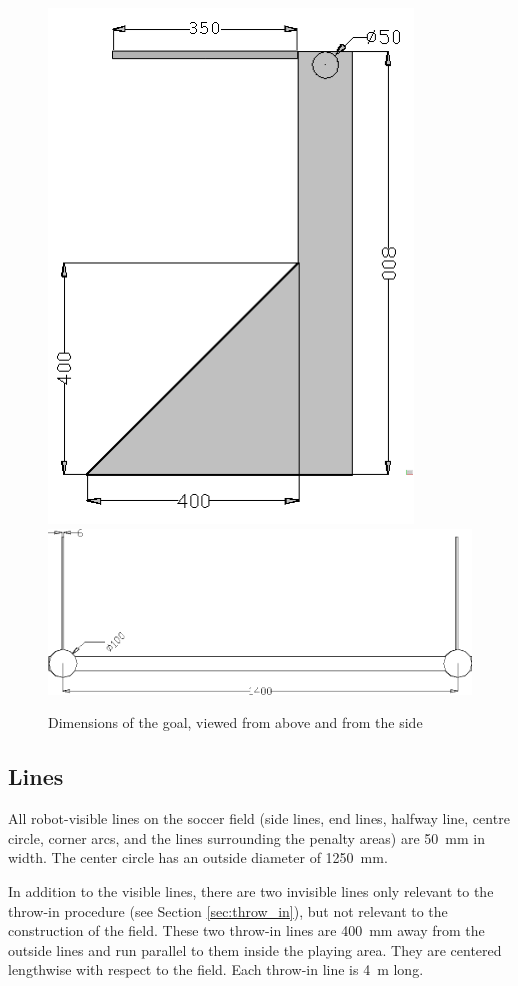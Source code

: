 \documentclass[12pt]{article}
\begin{document}
\begin{figure}[t!]
\begin{center}
\leavevmode
\includegraphics[width=0.4\columnwidth]{figs/goals2010_2.png}\\
\includegraphics[width=0.8\columnwidth]{figs/goal_with_dims_top.png}
\caption{Dimensions of the goal, viewed from above and from the side}
\label{fig:goal_dimensions}
\end{center}
\end{figure}

\subsection{Lines}\label{sec:field_lines}

All robot-visible lines on the soccer field (side lines, end lines, halfway line, centre circle, corner arcs, and the lines surrounding the penalty areas) are 50~mm in width. The center circle has an outside diameter of 1250~mm.

In addition to the visible lines, there are two invisible lines only relevant to the throw-in procedure (see Section \ref{sec:throw_in}), but not relevant to the construction of the field. These two throw-in lines are 400~mm away from the outside lines and run parallel to them inside the playing area. They are centered lengthwise with respect to the field. Each throw-in line is 4~m long.
\end{document}
